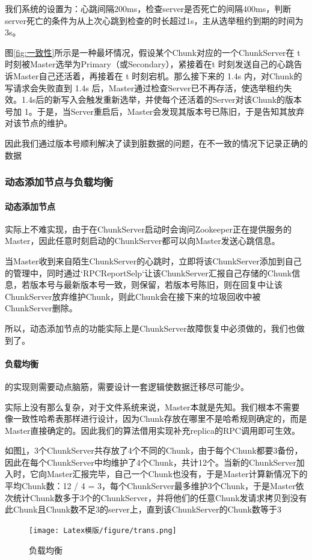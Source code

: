 \documentclass[UTF8]{ctexart}
\begin{document}
\begin{itemize}
我们系统的设置为：心跳间隔200ms，检查server是否死亡的间隔400ms，判断server死亡的条件为从上次心跳到检查的时长超过1s，主从选举租约到期的时间为3s。

图\ref{fig:一致性}所示是一种最坏情况，假设某个Chunk对应的一个ChunkServer在 t 时刻被Master选举为Primary（或Secondary），紧接着在t 时刻发送自己的心跳告诉Master自己还活着，再接着在 t 时刻宕机。那么接下来的 1.4s 内，对Chunk的写请求会失败直到 1.4s 后，Master通过检查Server已不再存活，使选举租约失效。1.4s后的新写入会触发重新选举，并使每个还活着的Server对该Chunk的版本号加 1。于是，当Server重启后，Master会发现其版本号已陈旧，于是告知其放弃对该节点的维护。

因此我们通过版本号顺利解决了读到脏数据的问题，在不一致的情况下记录正确的数据
\end{itemize}

\subsubsection{动态添加节点与负载均衡}
\paragraph{动态添加节点}实际上不难实现，由于在ChunkServer启动时会询问Zookeeper正在提供服务的Master，因此任意时刻启动的ChunkServer都可以向Master发送心跳信息。

当Master收到来自陌生ChunkServer的心跳时，立即将该ChunkServer添加到自己的管理中，同时通过`RPCReportSelp`让该ChunkServer汇报自己存储的Chunk信息，若版本号与最新版本号一致，则保留，若版本号陈旧，则在回复中让该ChunkServer放弃维护Chunk，则此Chunk会在接下来的垃圾回收中被ChunkServer删除。

所以，动态添加节点的功能实际上是ChunkServer故障恢复中必须做的，我们也做到了。

\paragraph{负载均衡}的实现则需要动点脑筋，需要设计一套逻辑使数据迁移尽可能少。

实际上没有那么复杂，对于文件系统来说，Master本就是先知。我们根本不需要像一致性哈希表那样进行设计，因为Chunk存放在哪里不是哈希规则确定的，而是Master直接确定的。因此我们的算法借用实现补充replica的RPC调用即可生效。

如图\ref{fig:负载均衡}，3个ChunkServer共存放了4个不同的Chunk，由于每个Chunk都要3备份，因此在每个ChunkServer中均维护了4个Chunk，共计12个。当新的ChunkServer加入时，它向Master汇报完毕，自己一个Chunk也没有，于是Master计算新情况下的平均Chunk数：12 / 4 = 3，每个ChunkServer最多维护3个Chunk，于是Master依次统计Chunk数多于3个的ChunkServer，并将他们的任意Chunk发请求拷贝到没有此Chunk且Chunk数不足3的server上，直到该ChunkServer的Chunk数等于3
\begin{figure}[h]
    \centering
    \texttt{[image: Latex模版/figure/trans.png]}
	\caption{负载均衡}
	\label{fig:负载均衡}
\end{figure}
\end{document}
